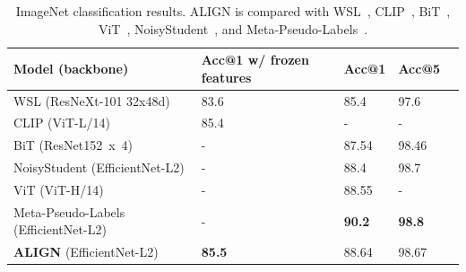\documentclass{article}
\begin{document}
\begin{table}[h!]
\vspace{-3mm}
\begin{center}
\caption{Top-1 Accuracy of zero-shot transfer of ALIGN to image classification on ImageNet and its variants.}
\label{tab:zs_imagenet_result}
\vskip -0.1in
\begin{small}
\end{small}
\end{center}
\vspace{-3mm}
\end{table}

\begin{table}[t!]
\vspace{-3mm}
\begin{center}
\caption{ImageNet classification results. ALIGN is compared with WSL~\cite{mahajan:wsl}, CLIP~\cite{radford:clip}, BiT~\cite{kolensnikov:bit}, ViT~\cite{dosovitskiy:vit}, NoisyStudent~\cite{xie:noisy_student}, and Meta-Pseudo-Labels~\cite{pham:mpl}.}
\label{tab:imagenet_result}
\begin{small}
\begin{tabular}{l|llll}
\toprule
Model (backbone) & Acc@1 w/ frozen features & Acc@1 & Acc@5\\
\midrule
WSL (ResNeXt-101 32x48d) & 83.6 & 85.4 & 97.6 \\
CLIP (ViT-L/14) & 85.4 & - & - \\
BiT (ResNet152~x~4) & - & 87.54 & 98.46 \\
NoisyStudent (EfficientNet-L2) & - & 88.4 & 98.7 \\
ViT (ViT-H/14) & - & 88.55 & - \\
Meta-Pseudo-Labels (EfficientNet-L2) & - & \textbf{90.2} & \textbf{98.8} \\
\textbf{ALIGN} (EfficientNet-L2) & \textbf{85.5} & 88.64 & 98.67 \\ 
\bottomrule
\end{tabular}
\end{small}
\end{center}
\vspace{-5mm}
\end{table}
\end{document}
